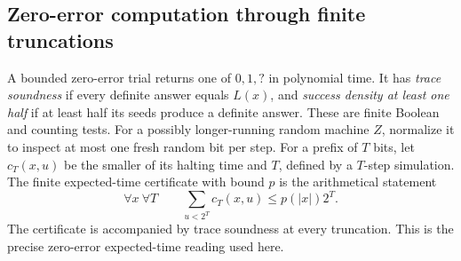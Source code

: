 \subsection{Zero-error computation through finite truncations}

A bounded zero-error trial returns one of $0,1,?$ in polynomial time.
It has \emph{trace soundness} if every definite answer equals $L(x)$,
and \emph{success density at least one half} if at least half its seeds
produce a definite answer. These are finite Boolean and counting tests.
For a possibly longer-running random machine $Z$, normalize it to inspect
at most one fresh random bit per step. For a prefix of $T$ bits, let
$c_T(x,u)$ be the smaller of its halting time and $T$, defined by a
$T$-step simulation. The finite expected-time certificate with bound $p$
is the arithmetical statement
\[
 \forall x\ \forall T\qquad
 \sum_{u<2^T}c_T(x,u)\leq p(|x|)2^T.                              \tag{R9}
\]
The certificate is accompanied by trace soundness at every truncation.
This is the precise zero-error expected-time reading used here.

